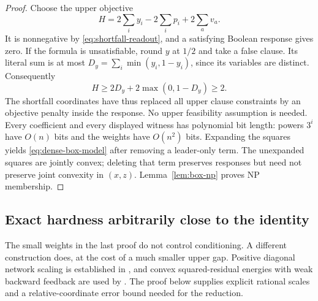 \begin{proof}
Choose the upper objective
\[
 H=2\sum_i y_i-2\sum_i p_i+2\sum_a v_a.
\]
It is nonnegative by \eqref{eq:shortfall-readout}, and a satisfying Boolean
response gives zero. If the formula is unsatisfiable, round \(y\) at \(1/2\)
and take a false clause. Its literal sum is at most
\(D_y=\sum_i\min(y_i,1-y_i)\), since its variables are distinct. Consequently
\[
 H\ge 2D_y+2\max(0,1-D_y)\ge2.
\]
The shortfall coordinates have thus replaced all upper clause constraints by
an objective penalty inside the response. No upper feasibility assumption is
needed. Every coefficient and every displayed witness has polynomial bit
length: powers \(3^i\) have \(O(n)\) bits and the weights have \(O(n^2)\) bits.
Expanding the squares yields \eqref{eq:dense-box-model} after removing a
leader-only term. The unexpanded squares are jointly convex; deleting that
term preserves responses but need not preserve joint convexity in \((x,z)\).
Lemma~\ref{lem:box-np} proves NP membership.
\end{proof}

\subsection{Exact hardness arbitrarily close to the identity}
\label{subsec:conditioned-hardness}
The small weights in the last proof do not control conditioning. A different
construction does, at the cost of a much smaller upper gap. Positive diagonal
network scaling is established in \citet[equations~(2.6)--(2.7)]{ElGhaouiEtAl2021},
and convex squared-residual energies with weak backward feedback are used by
\citet[Section~2]{ZachEstellers2019}. The proof below supplies explicit rational
scales and a relative-coordinate error bound needed for the reduction.

